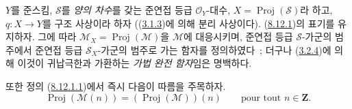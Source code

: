 \begin{env}[8.14.1]
\label{II.8.14.1-ko}
$Y$를 준스킴, $\mathcal{S}$를 \emph{양의 차수}를 갖는 준연접 등급
$\mathcal{O}_Y$-대수,
$X=\operatorname{Proj}(\mathcal{S})$라 하고, $q:X\to Y$를 구조 사상이라
하자 ((\hyperref[II.3.1.3-ko]{3.1.3})에 의해 분리 사상이다).
(\hyperref[II.8.12.1-ko]{8.12.1})의 표기를 유지하자. 그에 따라
$\mathcal{M}_X=\operatorname{Proj}(\mathcal{M})$을 $\mathcal{M}$에
대응시키며, 준연접 등급 $\mathcal{S}$-가군의 범주에서 준연접 등급
$\mathcal{S}_X$-가군의 범주로 가는 함자를 정의하였다~; 더구나
(\hyperref[II.3.2.4-ko]{3.2.4})에 의해 이것이
귀납극한과 가환하는 \emph{가법 완전 함자}임은 명백하다.

또한 정의 (\hyperref[II.8.12.1.1-ko]{8.12.1.1})에서 즉시 다음이
따름을 주목하자.
\begin{equation}
\label{II.8.14.1.1-ko}
  \operatorname{Proj}(\mathcal{M}(n))
  =(\operatorname{Proj}(\mathcal{M}))(n)
  \qquad\text{pour tout }n\in\mathbf{Z}.
\tag{8.14.1.1}
\end{equation}
\end{env}

